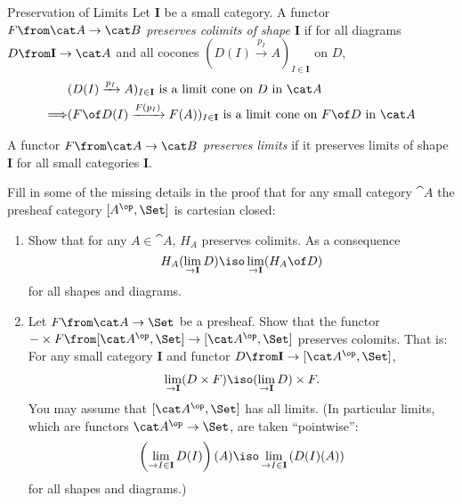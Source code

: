 \begin{definition}{Preservation of Limits}
  Let $\mathbf I$ be a small category. A functor $F\from \cat A\to\cat B$ \emph{preserves colimits of shape $\mathbf I$} if for all diagrams $D\from\mathbf I\to\cat A$ and all cocones $(D(I)\xrightarrow{p_I}A)_{I\in \mathbf I}$ on $D$,
  \begin{align*}
    &(D(I)\xrightarrow{p_I}A)_{I\in \mathbf I} \text{ is a limit cone on $D$ in } \cat A\\
    \Longrightarrow&(F\of D(I)\xrightarrow{F(p_I)}F(A))_{I\in \mathbf I} \text{ is a limit cone on $F\of D$ in } \cat A
  \end{align*}

  A functor $F\from \cat A\to\cat B$ \emph{preserves limits} if it preserves limits of shape $\mathbf I$ for all small categories $\mathbf I$.
\end{definition}
\begin{exercise}
  Fill in some of the missing details in the proof that for any small category $\cat A$ the presheaf category $[A^\op,\Set]$ is cartesian closed:
  \begin{enumerate}
  \item Show that for any $A\in\cat A$, $H_A$ preserves colimits. As a consequence $$H_A(\lim_{\to\mathbf I} D)\iso \lim_{\to\mathbf I}(H_A\of D)$$ for all shapes and diagrams.
  \item Let $F\from \cat A\to\Set$ be a presheaf. Show that the functor $-\times F\from [\cat A^\op,\Set]\to[\cat A^\op,\Set]$ preserves colomits. That is: For any small category $\mathbf I$ and functor $D\from\mathbf I\to [\cat A^\op,\Set]$,
    \begin{align*}
      \lim_{\to \mathbf I} (D\times F)\iso (\lim_{\to \mathbf I} D)\times F.
    \end{align*}
    You may assume that $[\cat A^\op,\Set]$ has all limits. (In particular limits, which are functors $\cat A^\op\to\Set$, are taken ``pointwise'': $$\left(\lim_{\to I\in\mathbf I} D(I)\right)(A) \iso \lim_{\to I\in\mathbf I} \left(D(I)(A)\right)$$ for all shapes and diagrams.)
  \end{enumerate}
\end{exercise}



